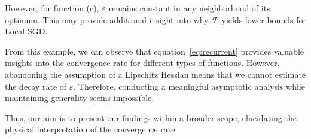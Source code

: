 \vspace{10pt}

However, for function (c), $\varepsilon$ remains constant in any neighborhood of its optimum. This may provide additional insight into why $\mathcal{F}$ yields lower bounds for Local SGD.

\vspace{10pt}

From this example, we can observe that equation~\ref{eq:recurrent} provides valuable insights into the convergence rate for different types of functions. However, abandoning the assumption of a Lipschitz Hessian means that we cannot estimate the decay rate of $\varepsilon$. Therefore, conducting a meaningful asymptotic analysis while maintaining generality seems impossible.

\vspace{10pt}

Thus, our aim is to present our findings within a broader scope, elucidating the physical interpretation of the convergence rate.
